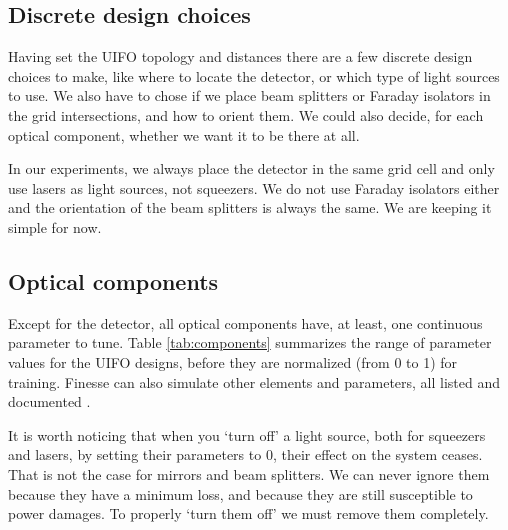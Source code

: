 \documentclass[a4paper,twocolumn,11pt,unpublished]{quantumarticle}
\begin{document}
\subsection{Discrete design choices}
Having set the UIFO topology and distances there are a few discrete design choices to make, like where to locate the detector, or which type of light sources to use. We also have to chose if we place beam splitters or Faraday isolators in the grid intersections, and how to orient them. We could also decide, for each optical component, whether we want it to be there at all.

In our experiments, we always place the detector in the same grid cell and only use lasers as light sources, not squeezers. We do not use Faraday isolators either and the orientation of the beam splitters is always the same. We are keeping it simple for now.


\subsection{Optical components}
Except for the detector, all optical components have, at least, one continuous parameter to tune. Table \ref{tab:components} summarizes the range of parameter values for the UIFO designs, before they are normalized (from 0 to 1) for training. Finesse can also simulate other elements and parameters, all listed and documented \cite{finesse}.

It is worth noticing that when you `turn off' a light source, both for squeezers and lasers, by setting their parameters to 0, their effect on the system ceases. That is not the case for mirrors and beam splitters. We can never ignore them because they have a minimum loss, and because they are still susceptible to power damages. To properly `turn them off' we must remove them completely.
\end{document}
